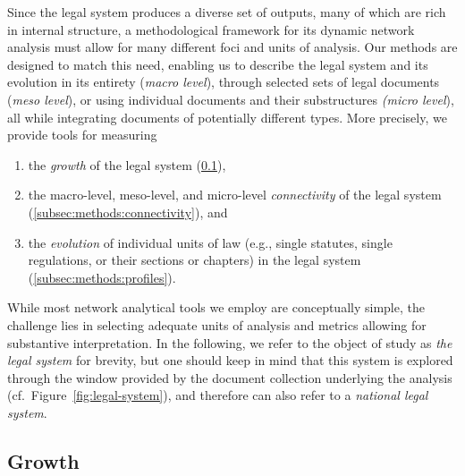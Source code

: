 \documentclass[utf8,sort&compress,table,hidelinks]{frontiersFPHY} %
\begin{document}
Since the legal system produces a diverse set of outputs, many of which are rich in internal structure, a methodological framework for its dynamic network analysis must allow for many different foci and units of analysis. 
Our methods are designed to match this need, enabling us to describe the legal system and its evolution in its entirety (\emph{macro level}), through selected sets of legal documents (\emph{meso level}), or using individual documents and their substructures \emph{(micro level}), 
all while integrating documents of potentially different types.
More precisely, we provide tools for measuring 
\begin{enumerate}
	\item the \emph{growth} of the legal system (\ref{subsec:methods:growth}),
	\item the macro-level, meso-level, and micro-level \emph{connectivity} of the legal system (\ref{subsec:methods:connectivity}), and 
	\item the \emph{evolution} of individual units of law (e.g., single statutes, single regulations, or their sections or chapters) in the legal system (\ref{subsec:methods:profiles}).
\end{enumerate}
While most network analytical tools we employ are conceptually simple, the challenge lies in selecting adequate units of analysis and metrics allowing for substantive interpretation.
In the following, we refer to the object of study as \emph{the legal system} for brevity, 
but one should keep in mind that this system is explored through the window provided by the document collection underlying the analysis (cf.~Figure~\ref{fig:legal-system}), 
and therefore can also refer to a \emph{national legal system}.

\vspace*{6pt}
\subsection{Growth}
\label{subsec:methods:growth}
\end{document}
